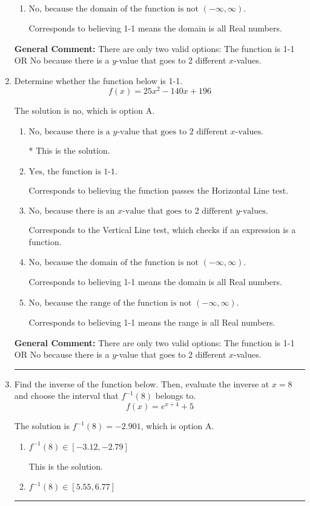 \documentclass{extbook}[14pt]
\newcommand{\litem}[1]{\item #1

\rule{\textwidth}{0.4pt}}
\begin{document}
\begin{enumerate}
{\begin{enumerate}[label=\Alph*.]
* This is the solution.
\item \( \text{No, because the domain of the function is not $(-\infty, \infty)$.} \)

Corresponds to believing 1-1 means the domain is all Real numbers.
\end{enumerate}

\textbf{General Comment:} There are only two valid options: The function is 1-1 OR No because there is a $y$-value that goes to 2 different $x$-values.
}
\litem{
Determine whether the function below is 1-1.
\[ f(x) = 25 x^2 - 140 x + 196 \]

The solution is \( \text{no} \), which is option A.\begin{enumerate}[label=\Alph*.]
\item \( \text{No, because there is a $y$-value that goes to 2 different $x$-values.} \)

* This is the solution.
\item \( \text{Yes, the function is 1-1.} \)

Corresponds to believing the function passes the Horizontal Line test.
\item \( \text{No, because there is an $x$-value that goes to 2 different $y$-values.} \)

Corresponds to the Vertical Line test, which checks if an expression is a function.
\item \( \text{No, because the domain of the function is not $(-\infty, \infty)$.} \)

Corresponds to believing 1-1 means the domain is all Real numbers.
\item \( \text{No, because the range of the function is not $(-\infty, \infty)$.} \)

Corresponds to believing 1-1 means the range is all Real numbers.
\end{enumerate}

\textbf{General Comment:} There are only two valid options: The function is 1-1 OR No because there is a $y$-value that goes to 2 different $x$-values.
}
\litem{
Find the inverse of the function below. Then, evaluate the inverse at $x = 8$ and choose the interval that $f^{-1}(8)$ belongs to.
\[ f(x) = e^{x+4}+5 \]

The solution is \( f^{-1}(8) = -2.901 \), which is option A.\begin{enumerate}[label=\Alph*.]
\item \( f^{-1}(8) \in [-3.12, -2.79] \)

 This is the solution.
\item \( f^{-1}(8) \in [5.55, 6.77] \)


\end{enumerate}}
\end{enumerate}
\end{document}
